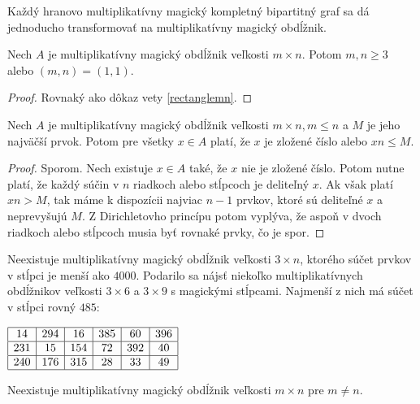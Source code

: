 Každý hranovo multiplikatívny magický kompletný bipartitný graf sa dá jednoducho transformovať na multiplikatívny magický obdĺžnik. \\

\begin{theorem} Nech $A$ je multiplikatívny magický obdĺžnik veľkosti $m \times n$. Potom $m,n \geq 3$ alebo $(m, n) = (1, 1)$.
\end{theorem}

\begin{proof} Rovnaký ako dôkaz vety \ref{rectanglemn}.
\end{proof}

\begin{theorem}
\label{rectanglemax}
Nech $A$ je multiplikatívny magický obdĺžnik veľkosti $m \times n, m \leq n$ a $M$ je jeho najväčší prvok. Potom pre všetky $x \in A$ platí, že $x$ je zložené číslo alebo $xn \leq M$.
\end{theorem}

\begin{proof} Sporom. Nech existuje $x \in A$ také, že $x$ nie je zložené číslo. Potom nutne platí, že každý súčin v $n$ riadkoch alebo stĺpcoch je deliteľný $x$. Ak však platí $xn > M$, tak máme k dispozícii najviac $n-1$ prvkov, ktoré sú deliteľné $x$ a neprevyšujú $M$. Z Dirichletovho princípu potom vyplýva, že aspoň v dvoch riadkoch alebo stĺpcoch musia byť rovnaké prvky, čo je spor.
\end{proof}

\begin{result} Neexistuje multiplikatívny magický obdĺžnik veľkosti $3 \times n$, ktorého súčet prvkov v stĺpci je menší ako $4000$. Podarilo sa nájsť niekoľko multiplikatívnych obdĺžnikov veľkosti $3 \times 6$ a $3 \times 9$ s magickými stĺpcami. Najmenší z nich má súčet v stĺpci rovný $485$:
\end{result}

\begin{center}
$\begin{array}{ |c|c|c|c|c|c| } 
\hline
14 & 294 & 16 & 385 & 60 & 396 \\ 
\hline
231 & 15 & 154 & 72 & 392 & 40 \\ 
\hline
240 & 176 & 315 & 28 & 33 & 49 \\ 
\hline
\end{array}$
\end{center}

\begin{hypothesis} Neexistuje multiplikatívny magický obdĺžnik veľkosti $m \times n$ pre $m \neq n$.
\end{hypothesis}

